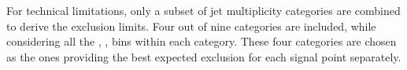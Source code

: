 For technical limitations, only a subset of jet multiplicity categories are combined to derive the exclusion limits. 
Four out of nine \nj categories are included, while considering all the \nb, \scalht, \mht bins within each \nj category. 
These four categories are chosen as the ones providing the best expected exclusion for each signal point separately. \\




